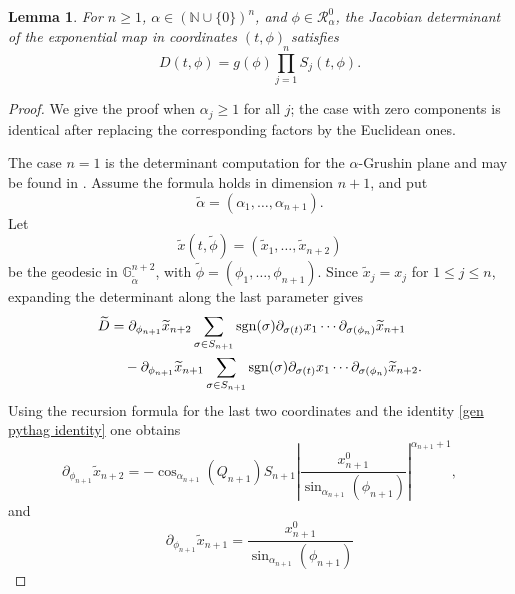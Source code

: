 \documentclass[12pt]{amsart}
\numberwithin{equation}{section}
\theoremstyle{plain}
\newtheorem{lemma}[theorem]{Lemma}%
\theoremstyle{definition}
\theoremstyle{remark}
\begin{document}
\begin{lemma}\label{Determinant Formula Theorem}
    For \(n\geq1\), \(\alpha\in(\mathbb N\cup\{0\})^n\), and
    \(\phi\in\mathcal R_\alpha^0\), the Jacobian determinant of the exponential map in
    coordinates \((t,\phi)\) satisfies
    \begin{equation}\label{Determinant Factorization}
        D(t,\phi)=g(\phi)\prod_{j=1}^n S_j(t,\phi).
    \end{equation}
\end{lemma}

\begin{proof}
    We give the proof when \(\alpha_j\geq1\) for all \(j\); the case with zero components is
    identical after replacing the corresponding factors by the Euclidean ones.

    The case \(n=1\) is the determinant computation for the \(\alpha\)-Grushin plane and may be found in
    \cite{Borza2022}. Assume the formula holds in dimension \(n+1\), and put
    \[
        \widetilde\alpha=(\alpha_1,\ldots,\alpha_{n+1}).
    \]
    Let
    \[
        \widetilde x(t,\widetilde\phi)
        =
        (\widetilde x_1,\ldots,\widetilde x_{n+2})
    \]
    be the geodesic in \(\mathbb G^{n+2}_{\widetilde\alpha}\), with
    \(\widetilde\phi=(\phi_1,\ldots,\phi_{n+1})\). Since
    \(\widetilde x_j=x_j\) for \(1\leq j\leq n\), expanding the determinant along the last
    parameter gives
    \begin{align}\label{Determinant Induction}
        \widetilde D
         & =
        \partial_{\phi_{n+1}}\widetilde x_{n+2}
        \sum_{\sigma\in S_{n+1}}
        \operatorname{sgn}(\sigma)
        \partial_{\sigma(t)}x_1\cdots
        \partial_{\sigma(\phi_n)}\widetilde x_{n+1}
        \notag   \\
         & \quad
        -
        \partial_{\phi_{n+1}}\widetilde x_{n+1}
        \sum_{\sigma\in S_{n+1}}
        \operatorname{sgn}(\sigma)
        \partial_{\sigma(t)}x_1\cdots
        \partial_{\sigma(\phi_n)}\widetilde x_{n+2}.
    \end{align}
    Using the recursion formula for the last two coordinates and the identity \eqref{gen pythag identity} one obtains
    \[
        \partial_{\phi_{n+1}}\widetilde x_{n+2}
        =
        -
        \cos_{\alpha_{n+1}}(Q_{n+1})
        S_{n+1}
        \left|
        \frac{x_{n+1}^0}{\sin_{\alpha_{n+1}}(\phi_{n+1})}
        \right|^{\alpha_{n+1}+1},
    \]
    and
    \[
        \partial_{\phi_{n+1}}\widetilde x_{n+1}
        =
        \frac{x_{n+1}^0}{\sin_{\alpha_{n+1}}(\phi_{n+1})}
\]
\end{proof}
\end{document}
